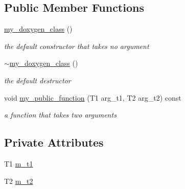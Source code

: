 \subsection*{Public Member Functions}
\begin{DoxyCompactItemize}
\item 
\mbox{\label{classPereskokov__Vladislav_1_1my__doxygen__class_a2dd044bcc5a7b03158acde6aec3bdbff}} 
\hyperlink{classPereskokov__Vladislav_1_1my__doxygen__class_a2dd044bcc5a7b03158acde6aec3bdbff}{my\+\_\+doxygen\+\_\+class} ()
\begin{DoxyCompactList}\small\item\em the default constructor that takes no argument \end{DoxyCompactList}\item 
\mbox{\label{classPereskokov__Vladislav_1_1my__doxygen__class_a4c93f7b32c21e665b2631a7d240789e8}} 
\hyperlink{classPereskokov__Vladislav_1_1my__doxygen__class_a4c93f7b32c21e665b2631a7d240789e8}{$\sim$my\+\_\+doxygen\+\_\+class} ()
\begin{DoxyCompactList}\small\item\em the default destructor \end{DoxyCompactList}\item 
void \hyperlink{classPereskokov__Vladislav_1_1my__doxygen__class_a90642e89277ce4bb3493e3cf2a6193c4}{my\+\_\+public\+\_\+function} (T1 arg\+\_\+t1, T2 arg\+\_\+t2) const
\begin{DoxyCompactList}\small\item\em a function that takes two arguments \end{DoxyCompactList}\end{DoxyCompactItemize}
\subsection*{Private Attributes}
\begin{DoxyCompactItemize}
\item 
T1 \hyperlink{classPereskokov__Vladislav_1_1my__doxygen__class_a0f7259804082c8a55fe0c9cbf2835fa9}{m\+\_\+t1}
\item 
T2 \hyperlink{classPereskokov__Vladislav_1_1my__doxygen__class_a54ac784b0f4d5976c4879e024166bf04}{m\+\_\+t2}
\end{DoxyCompactItemize}



